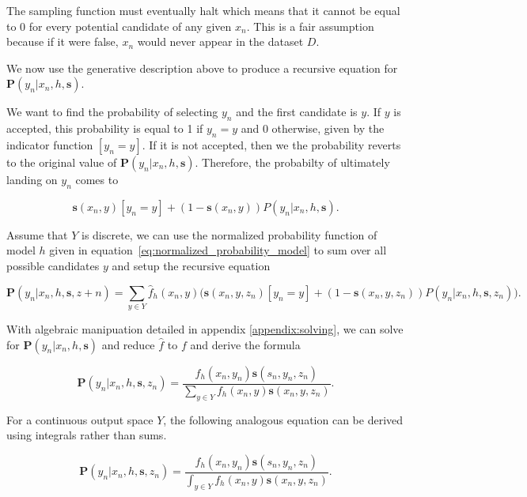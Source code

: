 \documentclass[twoside]{article}
\begin{document}
The sampling function must eventually halt which means that it cannot be equal to 0 for every potential candidate of any given \(x_n\). This is a fair assumption because if it were false, \(x_n\) would never appear in the dataset \(D\).

We now use the generative description above to produce a recursive equation for \(\mathbf{P}(y_n|x_n,h,\mathbf{s})\).

We want to find the probability of selecting \(y_n\) and the first candidate is \(y\). If \(y\) is accepted, this probability is equal to 1 if \(y_n = y\) and 0 otherwise, given by the indicator function \(\left [y_n = y\right ]\). If it is not accepted, then we the probability reverts to the original value of \(\mathbf{P}(y_n|x_n,h,\mathbf{s})\). Therefore, the probabilty of ultimately landing on \(y_n\) comes to

\[\mathbf{s}(x_n,y)\left [y_n = y\right ] + (1-\mathbf{s}(x_n,y))P(y_n|x_n,h,\mathbf{s}).\]

Assume that \(Y\) is discrete, we can use the normalized probability function of model \(h\) given in equation~\eqref{eq:normalized_probability_model} to sum over all possible candidates \(y\) and setup the recursive equation

\begin{equation}
\label{eq:bias_corrected_setup}
\mathbf{P}(y_n|x_n,h,\mathbf{s},z+n)=\sum_{y \in Y}\hat{f}_h(x_n,y)\big(\mathbf{s}(x_n,y,z_n)\left [y_n = y\right ] + (1-\mathbf{s}(x_n,y,z_n))P(y_n|x_n,h,\mathbf{s},z_n)\big).
\end{equation}

With algebraic manipuation detailed in appendix \ref{appendix:solving}, we can solve for \(\mathbf{P}(y_n|x_n,h,\mathbf{s})\) and reduce \(\hat{f}\) to \(f\) and derive the formula

\begin{equation}
\label{eq:bias_corrected_prob}
\mathbf{P}(y_n|x_n,h,\mathbf{s},z_n)=\frac{f_h(x_n,y_n)\mathbf{s}(s_n,y_n,z_n)}{\sum_{y \in Y}f_h(x_n,y)\mathbf{s}(x_n,y,z_n)}.
\end{equation}

For a continuous output space \(Y\), the following analogous equation can be derived using integrals rather than sums.

\begin{equation}
\label{eq:bias_corrected_prob_continuous}
\mathbf{P}(y_n|x_n,h,\mathbf{s},z_n)=\frac{f_h(x_n,y_n)\mathbf{s}(s_n,y_n,z_n)}{\int_{y \in Y}f_h(x_n,y)\mathbf{s}(x_n,y,z_n)}.
\end{equation}
\end{document}
